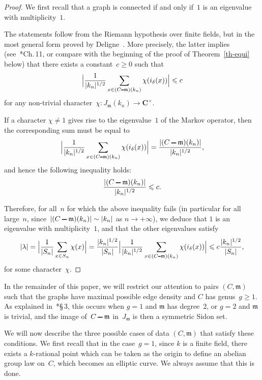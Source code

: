 \documentclass[12pt]{amsart}
\renewcommand{\leq}{\leqslant}
\renewcommand{\geq}{\geqslant}
\numberwithin{equation}{section}
\def\setminus{\mathchoice
    {\mathbin{\vrule height .62ex width 1.61ex depth -.38ex}}%
    {\mathbin{\vrule height .62ex width 1.61ex depth -.38ex}}%
    {\mathbin{\vrule height .50ex width 0.85ex depth -.28ex}}%
    {\mathbin{\vrule height .20ex width 0.570ex depth -.24ex}}%
}
\newcommand{\Cc}{\mathbf{C}}
\newcommand{\mfm}{\mathfrak{m}}
\theoremstyle{plain}
\theoremstyle{remark}
\theoremstyle{definition}
\renewcommand{\geq}{\geqslant}
\renewcommand{\leq}{\leqslant}
\begin{document}
\begin{proof}
  We first recall that a graph is connected if and only if~$1$ is an
  eigenvalue with multiplicity~$1$.

  The statements follow from the Riemann hypothesis over finite fields,
  but in the most general form proved by Deligne~\cite{weil2}. More
  precisely, the latter implies (see~\cite{ffk}*{Ch.\,11}, or compare
  with the beginning of the proof of Theorem~\ref{th-equi}
  below) that there exists a constant~$c\geq 0$ such that
  \[
    \Bigl|\frac{1}{|k_n|^{1/2}}\sum_{x\in
      (C\setminus\mfm)(k_n)}\chi(i_{\delta}(x))
    \Bigr|\leq c
  \]
  for any non-trivial
  character~$\chi\colon J_{\mfm}(k_n)\to\Cc^{\times}$. 

  If a character $\chi\not=1$ gives rise to the eigenvalue~$1$ of the
  Markov operator, then the corresponding sum must be equal to
  \[
    \Bigl|\frac{1}{|k_n|^{1/2}}\sum_{x\in
      (C\setminus\mfm)(k_n)}\chi(i_{\delta}(x)) \Bigr|
    =\frac{|(C\setminus\mfm)(k_n)|}{|k_n|^{1/2}}, 
  \]
and hence the following inequality holds: 
  \[
    \frac{|(C\setminus\mfm)(k_n)|}{|k_n|^{1/2}}\leq c.
  \]

  Therefore, for all~$n$ for which the above inequality fails (in particular for
  all large~$n$, since~\hbox{$|(C\setminus \mfm)(k_n)|\sim |k_n|$} as
  $n\to +\infty$), we deduce that $1$ is an eigenvalue with
  multiplicity~$1$, and that the other eigenvalues
  satisfy
   \[
    |\lambda|=\Bigl|\frac{1}{|S_n|}\sum_{x\in S_n}\chi(x)\Bigr|
    =\frac{|k_n|^{1/2}}{|S_n|} \Bigl|\frac{1}{|k_n|^{1/2}}\sum_{x\in
      (C\setminus \mfm)(k_n)}\chi(i_{\delta}(x))\Bigr|\leq c
    \frac{|k_n|^{1/2}}{|S_n|},
  \]
  for some character~$\chi$.
\end{proof}

In the remainder of this paper, we will restrict our attention to pairs
$(C,\mfm)$ such that the graphs have maximal possible edge density and
$C$ has genus~$g\geq 1$. As explained in~\cite{ffk2}*{\S\,3}, this occurs when
$g=1$ and $\mfm$ has degree~$2$, or $g=2$ and $\mfm$ is trivial, and the
image of~$C\setminus\mfm$ in~$J_{\mfm}$ is then a symmetric Sidon set.

We will now describe the three possible cases of data $(C,\mfm)$ that 
satisfy these conditions. We first recall that in the case~$g=1$,
since $k$ is a finite field, there exists a $k$-rational point which can
be taken as the origin to define an abelian group law on~$C$, which
becomes an elliptic curve. We always assume that this is done. 
\end{document}
